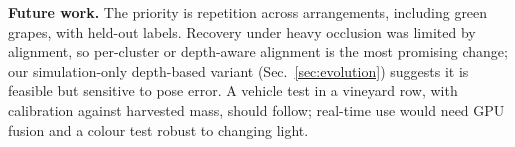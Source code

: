 \textbf{Future work.} The priority is repetition across arrangements, including green grapes, with held-out labels. Recovery under heavy occlusion was limited by alignment, so per-cluster or depth-aware alignment is the most promising change; our simulation-only depth-based variant (Sec.~\ref{sec:evolution}) suggests it is feasible but sensitive to pose error. A vehicle test in a vineyard row, with calibration against harvested mass, should follow; real-time use would need GPU fusion and a colour test robust to changing light.
